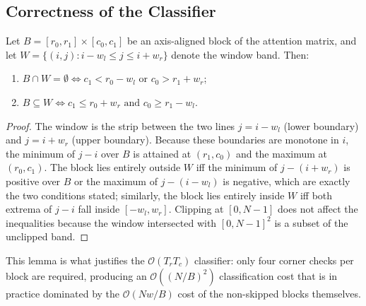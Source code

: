 \subsection{Correctness of the Classifier}\label{sec:swfa_classify_proof}
\begin{lemma}\label{lem:corner}
Let $B = [r_0, r_1] \times [c_0, c_1]$ be an axis-aligned block of the
attention matrix, and let
$W = \{(i, j) : i - w_l \le j \le i + w_r\}$ denote the window band.
Then:
\begin{enumerate}
    \item[\textup{(i)}]
    $B \cap W = \emptyset \iff c_1 < r_0 - w_l \text{ or } c_0 > r_1 + w_r$;
    \item[\textup{(ii)}]
    $B \subseteq W \iff c_1 \le r_0 + w_r \text{ and } c_0 \ge r_1 - w_l$.
\end{enumerate}
\end{lemma}
\begin{proof}
The window is the strip between the two lines $j = i - w_l$ (lower
boundary) and $j = i + w_r$ (upper boundary). Because these boundaries
are monotone in $i$, the minimum of $j - i$ over $B$ is attained at
$(r_1, c_0)$ and the maximum at $(r_0, c_1)$. The block lies entirely
outside $W$ iff the minimum of $j - (i + w_r)$ is positive over $B$
or the maximum of $j - (i - w_l)$ is negative, which are exactly the
two conditions stated; similarly, the block lies entirely inside $W$
iff both extrema of $j - i$ fall inside $[-w_l, w_r]$. Clipping at
$[0, N-1]$ does not affect the inequalities because the window
intersected with $[0, N-1]^2$ is a subset of the unclipped band.
\end{proof}

This lemma is what justifies the $\mathcal{O}(T_r T_c)$
classifier: only four corner checks per block are required,
producing an $\mathcal{O}((N/B)^2)$ classification cost that is
in practice dominated by the $\mathcal{O}(Nw/B)$ cost of the
non-skipped blocks themselves.

